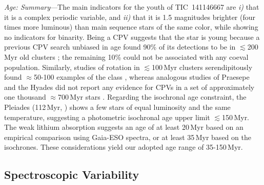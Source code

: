 \documentclass{nature3}
\begin{document}
\begin{methods}
{\it Age: Summary}---The main indicators for the youth of
TIC~141146667 are {\it i)} that it is a complex periodic variable, and
{\it ii)} that it is 1.5 magnitudes brighter (four times more
luminous) than main sequence stars of the same color, while showing no
indicators for binarity.  Being a CPV suggests that the star is young
because a previous CPV search unbiased in age found 90\% of its
detections to be in $\lesssim$200\,Myr old clusters \cite{Bouma2024};
the remaining 10\% could not be associated with any coeval
population.
Similarly, studies of rotation in $\lesssim$100\,Myr clusters serendipitously found
$\approx$50-100 examples of the class
\cite{Rebull2016,Stauffer2017,Stauffer2018,Rebull2018,Zhan2019,Rebull2020,Stauffer2021,Rebull2022,Popinchalk2023},
whereas analogous studies of Praesepe and the Hyades did not report
any evidence for CPVs in a set of approximately one thousand
$\approx$700\,Myr stars \cite{Rebull2017,Douglas2019,Rampalli2021}.
Regarding the isochronal age constraint, the Pleiades (112\,Myr,
\cite{Dahm2015}) shows a few stars of equal luminosity and the same
temperature, suggesting a photometric isochronal age upper limit
$\lesssim$150\,Myr.  The weak lithium absorption suggests an age of at
least 20\,Myr based on an empirical comparison using Gaia-ESO spectra,
or at least 35\,Myr based on the \cite{Feiden2016} isochrones.  These
considerations yield our adopted age range of 35-150\,Myr.




\subsection{Spectroscopic Variability}\phantom{+}
\label{subsec:specvar}


\end{methods}
\end{document}
